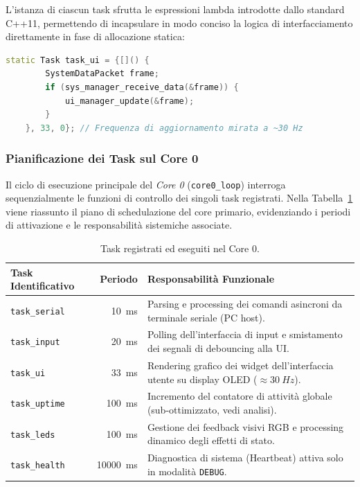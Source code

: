 L'istanza di ciascun task sfrutta le espressioni lambda introdotte dallo standard C++11, permettendo di incapsulare in modo conciso la logica di interfacciamento direttamente in fase di allocazione statica:

\begin{lstlisting}[language=C++, caption={core0\_manager.cpp --- Allocazione statica del task grafico dell'interfaccia utente}]
static Task task_ui = {[]() {
        SystemDataPacket frame;
        if (sys_manager_receive_data(&frame)) {
            ui_manager_update(&frame);
        }
    }, 33, 0}; // Frequenza di aggiornamento mirata a ~30 Hz
\end{lstlisting}

\subsubsection*{Pianificazione dei Task sul Core 0}

Il ciclo di esecuzione principale del \textit{Core 0} (\texttt{core0\_loop}) interroga sequenzialmente le funzioni di controllo dei singoli task registrati. Nella Tabella~\ref{tab:scheduler_core0} viene riassunto il piano di schedulazione del core primario, evidenziando i periodi di attivazione e le responsabilità sistemiche associate.

\begin{table}[htbp]
\centering
\caption{Task registrati ed eseguiti nel Core 0.}
\label{tab:scheduler_core0}
\begin{tabularx}{\textwidth}{@{}l r X@{}}
    \toprule
    \textbf{Task Identificativo} & \textbf{Periodo} & \textbf{Responsabilità Funzionale} \\
    \midrule
    \texttt{task\_serial}  & \qty{10}{ms}  & Parsing e processing dei comandi asincroni da terminale seriale (PC host). \\
    \texttt{task\_input}   & \qty{20}{ms}  & Polling dell'interfaccia di input e smistamento dei segnali di debouncing alla UI. \\
    \texttt{task\_ui}      & \qty{33}{ms}  & Rendering grafico dei widget dell'interfaccia utente su display OLED ($\approx \qty{30}{Hz}$). \\
    \texttt{task\_uptime}  & \qty{100}{ms} & Incremento del contatore di attività globale (sub-ottimizzato, vedi analisi). \\
    \texttt{task\_leds}    & \qty{100}{ms} & Gestione dei feedback visivi RGB e processing dinamico degli effetti di stato. \\
    \texttt{task\_health}  & \qty{10000}{ms}& Diagnostica di sistema (Heartbeat) attiva solo in modalità \texttt{DEBUG}. \\
    \bottomrule
\end{tabularx}
\end{table}

